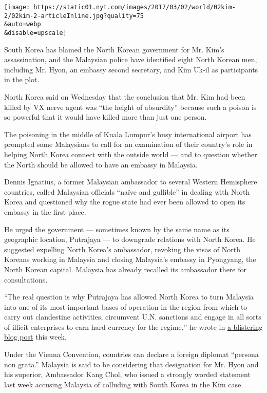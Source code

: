 \texttt{[image: https://static01.nyt.com/images/2017/03/02/world/02kim-2/02kim-2-articleInline.jpg?quality=75\\\&auto=webp\\\&disable=upscale]}

South Korea has blamed the North Korean government for Mr. Kim's
assassination, and the Malaysian police have identified eight North
Korean men, including Mr. Hyon, an embassy second secretary, and Kim
Uk-il as participants in the plot.

North Korea said on Wednesday that the conclusion that Mr. Kim had been
killed by VX nerve agent was ``the height of absurdity'' because such a
poison is so powerful that it would have killed more than just one
person.

The poisoning in the middle of Kuala Lumpur's busy international airport
has prompted some Malaysians to call for an examination of their
country's role in helping North Korea connect with the outside world ---
and to question whether the North should be allowed to have an embassy
in Malaysia.

Dennis Ignatius, a former Malaysian ambassador to several Western
Hemisphere countries, called Malaysian officials ``naïve and gullible''
in dealing with North Korea and questioned why the rogue state had ever
been allowed to open its embassy in the first place.

He urged the government --- sometimes known by the same name as its
geographic location, Putrajaya --- to downgrade relations with North
Korea. He suggested expelling North Korea's ambassador, revoking the
visas of North Koreans working in Malaysia and closing Malaysia's
embassy in Pyongyang, the North Korean capital. Malaysia has already
recalled its ambassador there for consultations.

``The real question is why Putrajaya has allowed North Korea to turn
Malaysia into one of its most important bases of operation in the region
from which to carry out clandestine activities, circumvent U.N.
sanctions and engage in all sorts of illicit enterprises to earn hard
currency for the regime,'' he wrote in
\href{https://dennisignatius.com/2017/02/27/assassination-puts-the-spotlight-on-malaysia/}{a
blistering blog post} this week.

Under the Vienna Convention, countries can declare a foreign diplomat
``persona non grata.'' Malaysia is said to be considering that
designation for Mr. Hyon and his superior, Ambassador Kang Chol, who
issued a strongly worded statement last week accusing Malaysia of
colluding with South Korea in the Kim case.

